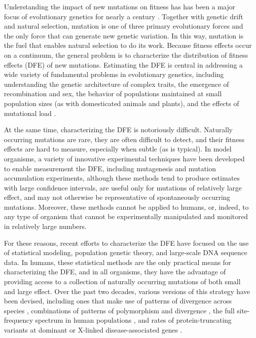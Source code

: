 \documentclass[11pt]{article}
\begin{document}
Understanding the impact of new mutations on fitness has has been a major focus of evolutionary genetics for nearly a century \cite{FISH22,HALD27,HALD37}. Together with genetic drift and natural selection, mutation is one of three primary evolutionary forces and the only force that can generate new genetic variation.  In this way, mutation is the fuel that enables natural selection to do its work.  Because fitness effects occur on a continuum, the general problem is to characterize the distribution of fitness effects (DFE) of new mutations.  Estimating the DFE is central in addressing a wide variety of fundamental problems in evolutionary genetics, including understanding the genetic architecture of complex traits, the emergence of recombination and sex, the behavior of populations maintained at small population sizes (as with domesticated animals and plants), and the effects of mutational load \cite{EYREKEIG07}.


At the same time, characterizing the DFE is notoriously difficult.  Naturally occurring mutations are rare, they are often difficult to detect, and their fitness effects are hard to measure, especially when subtle (as is typical).  In model organisms, a variety of innovative experimental techniques have been developed to enable measurement the DFE, including mutagenesis and mutation accumulation experiments, although these methods tend to produce estimates with large confidence intervals, are useful only for mutations of relatively large effect, and may not otherwise be representative of spontaneously occurring mutations.  Moreover, these methods cannot be applied to humans, or, indeed, to any type of organism that cannot be experimentally manipulated and monitored in relatively large numbers.

For these reasons, recent efforts to characterize the DFE have focused on the use of statistical modeling, population genetic theory, and large-scale DNA sequence data.  In humans, these statistical methods are the only practical means for characterizing the DFE, and in all organisms, they have the advantage of providing access to a collection of naturally occurring mutations of both small and large effect.
Over the past two decades, various versions of this strategy have been devised, including ones that make use of patterns of
divergence across species \cite{KIMU77,KONDCROW93,NIELYANG03,EYREKEIG99},  
combinations of patterns of polymorphism and divergence \cite{MCDOKREI91,SAWYHART92,BUSTETAL02,ARBIETAL13},
the full site-frequency spectrum in human populations \cite{EYREETAL06,BOYKETAL08,HUANSIEP19},
and rates of protein-truncating variants at dominant or X-linked disease-associated genes \cite{KOND03}.   %
\end{document}
